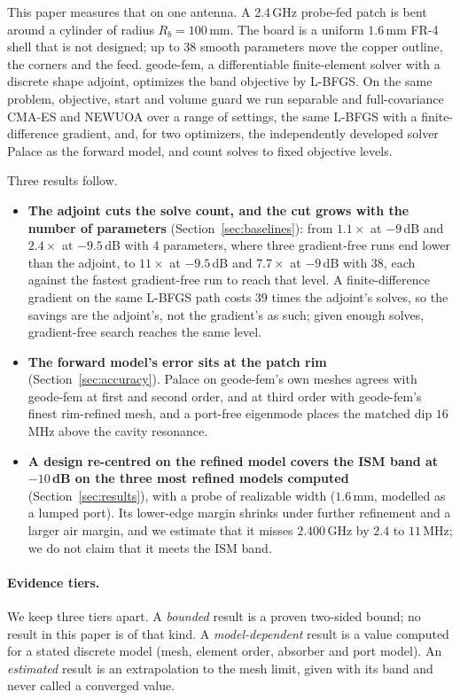 \documentclass{anvil-paper}
\begin{document}
This paper measures that on one antenna. A 2.4\,GHz probe-fed patch is bent
around a cylinder of radius $R_b = 100$\,mm. The board is a uniform
$1.6$\,mm FR-4 shell that is not designed; up to 38 smooth parameters move
the copper outline, the corners and the feed. geode-fem, a differentiable
finite-element solver with a discrete shape adjoint, optimizes the band
objective by L-BFGS. On the same problem, objective, start and volume guard
we run separable and full-covariance CMA-ES
\citep{hansen2001cmaes,ros2008separable} and NEWUOA
\citep{powell2006newuoa,zhang2023prima} over a range of settings, the same
L-BFGS with a finite-difference gradient, and, for two optimizers, the
independently developed solver Palace \citep{palace} as the forward model,
and count solves to fixed objective levels.

Three results follow.
\begin{itemize}
  \item \textbf{The adjoint cuts the solve count, and the cut grows with the
  number of parameters} (Section~\ref{sec:baselines}): from $1.1\times$ at
  $-9$\,dB and $2.4\times$ at $-9.5$\,dB with 4 parameters, where three
  gradient-free runs end lower than the adjoint, to $11\times$ at $-9.5$\,dB and $7.7\times$ at $-9$\,dB with 38,
  each against the fastest gradient-free run to reach that level. A
  finite-difference gradient on the same L-BFGS path costs $39$ times the
  adjoint's solves, so the savings are the adjoint's, not the gradient's as
  such; given enough solves, gradient-free search reaches the same level.
  \item \textbf{The forward model's error sits at the patch rim}
  (Section~\ref{sec:accuracy}). Palace on geode-fem's own meshes agrees with
  geode-fem at first and second order, and at third order with geode-fem's
  finest rim-refined mesh, and a port-free eigenmode
  places the matched dip $16$\,MHz above the cavity resonance.
  \item \textbf{A design re-centred on the refined model covers the ISM band
  at $-10$\,dB on the three most refined models computed}
  (Section~\ref{sec:results}), with a probe of realizable width ($1.6$\,mm,
  modelled as a lumped port). Its lower-edge margin shrinks under further
  refinement and a larger air margin, and we estimate that it misses
  $2.400$\,GHz by $2.4$ to $11$\,MHz; we do not claim that it meets the ISM band.
\end{itemize}

\paragraph{Evidence tiers.}
We keep three tiers apart. A \emph{bounded} result is a proven two-sided
bound; no result in this paper is of that kind. A \emph{model-dependent}
result is a value computed for a stated discrete model (mesh, element order,
absorber and port model). An \emph{estimated} result is an extrapolation to
the mesh limit, given with its band and never called a converged value.
\end{document}
